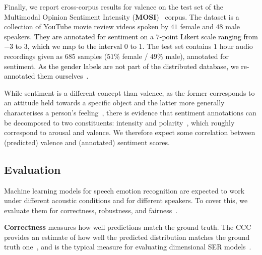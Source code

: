 \documentclass{article}
\newcommand{\review}[1]{\textcolor{black}{#1}}
\newcommand\mosi{\mbox{MOSI}}
\begin{document}
Finally, we report cross-corpus results for valence on the test set of the
Multimodal Opinion Sentiment Intensity (\textbf{\mosi})~\citep{zadeh2016mosi} corpus.
The dataset is a collection of YouTube movie review videos
spoken by $41$ female and $48$ male speakers.
\review{They are annotated for sentiment on a $7$-point Likert scale ranging from $-3$ to $3$, 
which we map to the interval $0$ to $1$.}
The test set contains $1$ hour audio recordings
given as 685 samples ($51$\% female / $49$\% male),
annotated for sentiment.
\review{As the gender labels are not part of the distributed database,
we re-annotated them ourselves~\citep{wierstorf2023zenodo}.}

While sentiment is a different concept than valence,
as the former corresponds to an attitude held towards a specific object
and the latter more generally characterises a person's feeling~\citep{munezero2014they},
there is evidence that sentiment annotations can be decomposed to two constituents:
intensity and polarity~\citep{tian2018polarity},
which roughly correspond to arousal and valence.
We therefore expect some correlation between (predicted) valence
and (annotated) sentiment scores.





\subsection{Evaluation}
\label{subsec:evaluation}

Machine learning models for speech emotion recognition
are expected to work under different acoustic conditions and for different speakers.
To cover this,
we evaluate them for correctness, robustness, and fairness~\citep{zhang2019testing}.

\textbf{Correctness}
measures how well predictions match the ground truth.
The \acf{CCC} provides an estimate of how well the 
predicted distribution matches the ground truth one~\citep{lin1989ccc},
and is the typical measure for evaluating dimensional \ac{SER} models~\citep{ringeval2018avec}.
\end{document}
